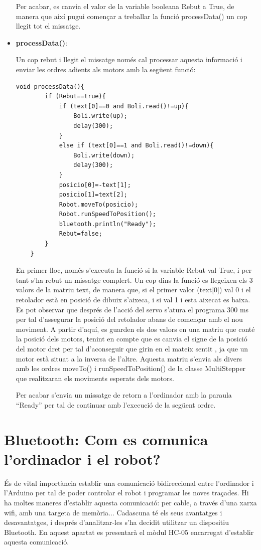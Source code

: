 \begin{itemize}
	Per acabar, es canvia el valor de la variable booleana Rebut a True, de manera que així pugui començar a treballar la funció processData() un cop llegit tot el missatge. 
	
	\item \textbf{processData()}:
	
	Un cop rebut i llegit el missatge només cal processar aquesta informació i enviar les ordres adients als motors amb la següent funció:
	
	\begin{lstlisting}[style=Arduino]
	void processData(){
		if (Rebut==true){
			if (text[0]==0 and Boli.read()!=up){
				Boli.write(up);
				delay(300);
			}
			else if (text[0]==1 and Boli.read()!=down){
				Boli.write(down);
				delay(300);
			}
			posicio[0]=-text[1];
			posicio[1]=text[2];
			Robot.moveTo(posicio);
			Robot.runSpeedToPosition();
			bluetooth.println("Ready");
			Rebut=false; 
		}
	}
	\end{lstlisting}
	
	En primer lloc, només s’executa la funció si la variable Rebut val True, i per tant s’ha rebut un missatge complert. Un cop dins la funció es llegeixen els 3 valors de la matriu text, de manera que, si el primer valor (text[0]) val 0 i el retolador està en posició de dibuix s’aixeca, i si val 1 i esta aixecat es baixa. Es pot observar que després de l’acció del servo s’atura el programa 300 ms per tal d’assegurar la posició del retolador abans de començar amb el nou moviment. A partir d’aquí, es guarden els dos valors en una matriu que conté la posició dels motors, tenint en compte que es canvia el signe de la posició del motor dret per tal d’aconseguir que girin en el mateix sentit , ja que un motor està situat a la inversa de l’altre. Aquesta matriu s’envia als divers amb les ordres moveTo() i runSpeedToPosition() de la classe MultiStepper que realitzaran els moviments esperats dels motors. 
	
	Per acabar s’envia un missatge de retorn a l’ordinador amb la paraula “Ready” per tal de continuar amb l’execució de la següent ordre. 
	
	
\end{itemize}

\section{Bluetooth: Com es comunica l'ordinador i el robot?}

És de vital importància establir una comunicació bidireccional entre l’ordinador i l’Arduino per tal de poder controlar el robot i programar les noves traçades. Hi ha moltes maneres d’establir aquesta comunicació: per cable, a través d’una xarxa wifi, amb una targeta de memòria... Cadascuna té els seus avantatges i desavantatges, i després d’analitzar-les s’ha decidit utilitzar un dispositiu Bluetooth. En aquest apartat es presentarà el mòdul HC-05 encarregat d’establir aquesta comunicació.

